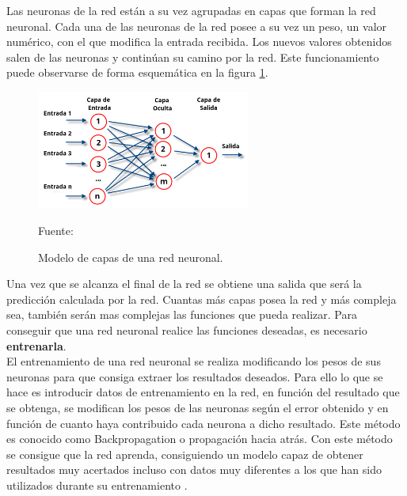 Las neuronas de la red están a su vez agrupadas en capas que forman la red neuronal. Cada una de las neuronas de la red posee a su vez un peso, un valor numérico, con el que modifica la entrada recibida. Los nuevos valores obtenidos salen de las neuronas y continúan su camino por la red. Este funcionamiento puede observarse de forma esquemática en la figura \ref{fig:estructura_red_neuronal}.\\

\begin{figure}[H]
    \begin{center}
        \includegraphics[width=7cm]{img/capitulo_2/Redes_neuronales_esquema.png}
        \caption{Modelo de capas de una red neuronal.\\}
        Fuente: \cite{perceptron_multicapa}
        \label{fig:estructura_red_neuronal}
    \end{center}
\end{figure}

Una vez que se alcanza el final de la red se obtiene una salida que será la predicción calculada por la red. Cuantas más capas posea la red y más compleja sea, también serán mas complejas las funciones que pueda realizar. Para conseguir que una red neuronal realice las funciones deseadas, es necesario \textbf{entrenarla}.\\

El entrenamiento de una red neuronal se realiza modificando los pesos de sus neuronas para que consiga extraer los resultados deseados. Para ello lo que se hace es introducir datos de entrenamiento en la red, en función del resultado que se obtenga, se modifican los pesos de las neuronas según el error obtenido y en función de cuanto haya contribuido cada neurona a dicho resultado. Este método es conocido como Backpropagation o propagación hacia atrás. Con este método se consigue que la red aprenda, consiguiendo un modelo capaz de obtener resultados muy acertados incluso con datos muy diferentes a los que han sido utilizados durante su entrenamiento \cite{atriainnovation:ia}.\\

